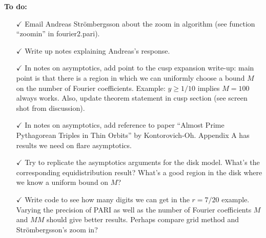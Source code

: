 \documentclass[]{article}
\begin{document}
\textbf{To do:}
\begin{itemize}
	\item[$\checkmark$] Email Andreas Str\"ombergsson about the zoom in algorithm (see function ``zoomin'' in fourier2.pari).
	\item[$\checkmark$] Write up notes explaining Andreas's response.
	\item[$\checkmark$] In notes on asymptotics, add point to the cusp expansion write-up: main point is that there is a region in which we can uniformly choose a bound $M$ on the number of Fourier coefficients. Example: $y \geq 1/10$ implies $M = 100$ always works.
	Also, update theorem statement in cusp section (see screen shot from discussion).
	\item[$\checkmark$] In notes on asymptotics, add reference to paper ``Almost Prime Pythagorean Triples in Thin Orbits'' by Kontorovich-Oh. Appendix A has results we need on flare asymptotics.
	\item[$\checkmark$] Try to replicate the asymptotics arguments for the disk model. What's the corresponding equidistribution result? What's a good region in the disk where we know a uniform bound on $M$?
	\item[$\checkmark$] Write code to see how many digits we can get in the $r = 7/20$ example. Varying the precision of PARI as well as the number of Fourier coefficients $M$ and $MM$ should give better results. Perhaps compare grid method and Str\"ombergsson's zoom in?
\end{itemize}
	
\end{document}
